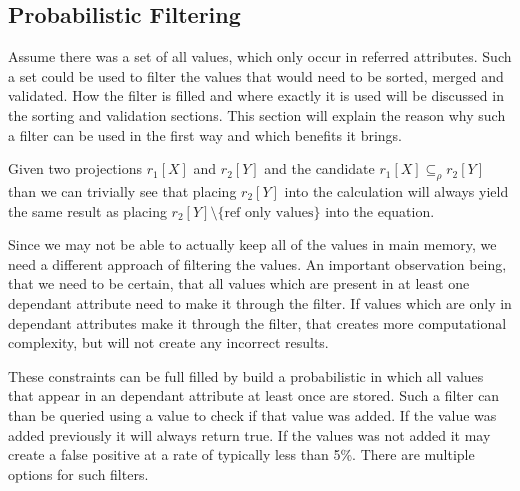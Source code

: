 \subsection{Probabilistic Filtering}
Assume there was a set of all values, which only occur in referred attributes. Such a set could be used to filter the values that would need to be sorted, merged and validated. How the filter is filled and where exactly it is used will be discussed in the sorting and validation sections. This section will explain the reason why such a filter can be used in the first way and which benefits it brings.

Given two projections $r_1[X]$ and $r_2[Y]$ and the candidate $r_1[X] \subseteq_\rho r_2[Y]$ than we can trivially see that placing $r_2[Y]$ into the calculation will always yield the same result as placing $r_2[Y] \setminus \text{\{ref only values\}}$ into the equation.

Since we may not be able to actually keep all of the values in main memory, we need a different approach of filtering the values. An important observation being, that we need to be certain, that all values which are present in at least one dependant attribute need to make it through the filter. If values which are only in dependant attributes make it through the filter, that creates more computational complexity, but will not create any incorrect results.

These constraints can be full filled by build a probabilistic in which all values that appear in an dependant attribute at least once are stored. Such a filter can than be queried using a value to check if that value was added. If the value was added previously it will always return true. If the values was not added it may create a false positive at a rate of typically less than 5\%. There are multiple options for such filters.




